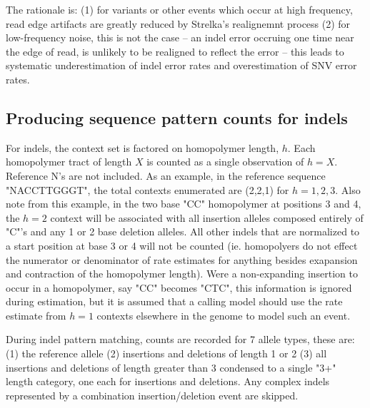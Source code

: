 \documentclass{article}
\begin{document}
The rationale is: (1) for variants or other events which occur at high frequency, read edge artifacts are greatly reduced by Strelka's realignemnt process (2) for low-frequency noise, this is not the case -- an indel error occruing one time near the edge of read, is unlikely to be realigned to reflect the error -- this leads to systematic underestimation of indel error rates and overestimation of SNV error rates.


\subsection{Producing sequence pattern counts for indels}

For indels, the context set is factored on homopolymer length, $h$. Each homopolymer tract of length $X$ is counted as a single observation of $h=X$. Reference N's are not included. As an example, in the reference sequence "NACCTTGGGT", the total contexts enumerated are (2,2,1) for $h=1,2,3$. Also note from this example, in the two base "CC" homopolymer at positions 3 and 4, the $h=2$ context will be associated with all insertion alleles composed entirely of "C"'s and any 1 or 2 base deletion alleles. All other indels that are normalized to a start position at base 3 or 4 will not be counted (ie. homopolyers do not effect the numerator or denominator of rate estimates for anything besides exapansion and contraction of the homopolymer length). Were a non-expanding insertion to occur in a homopolymer, say "CC" becomes "CTC", this information is ignored during estimation, but it is assumed that a calling model should use the rate estimate from $h=1$ contexts elsewhere in the genome to model such an event.

During indel pattern matching, counts are recorded for 7 allele types, these are: (1) the reference allele (2) insertions and deletions of length 1 or 2 (3) all insertions and deletions of length greater than 3 condensed to a single "3+" length category, one each for insertions and deletions. Any complex indels represented by a combination insertion/deletion event are skipped.
\end{document}
